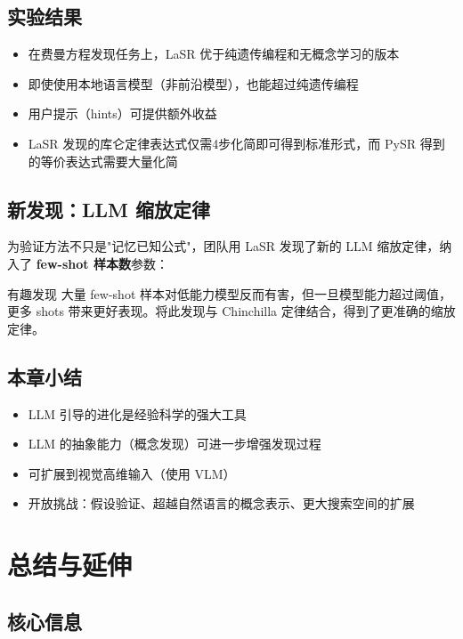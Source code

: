 \documentclass[a4paper]{article}
\begin{document}
\subsection{实验结果}

\begin{itemize}
    \item 在费曼方程发现任务上，LaSR 优于纯遗传编程和无概念学习的版本
    \item 即使使用本地语言模型（非前沿模型），也能超过纯遗传编程
    \item 用户提示（hints）可提供额外收益
    \item LaSR 发现的库仑定律表达式仅需4步化简即可得到标准形式，而 PySR 得到的等价表达式需要大量化简
\end{itemize}

\subsection{新发现：LLM 缩放定律}

为验证方法不只是"记忆已知公式"，团队用 LaSR 发现了新的 LLM 缩放定律，纳入了 \textbf{few-shot 样本数}参数：

\begin{warningbox}{有趣发现}
大量 few-shot 样本对低能力模型反而有害，但一旦模型能力超过阈值，更多 shots 带来更好表现。将此发现与 Chinchilla 定律结合，得到了更准确的缩放定律。
\end{warningbox}

\subsection{本章小结}

\begin{itemize}
    \item LLM 引导的进化是经验科学的强大工具
    \item LLM 的抽象能力（概念发现）可进一步增强发现过程
    \item 可扩展到视觉高维输入（使用 VLM）
    \item 开放挑战：假设验证、超越自然语言的概念表示、更大搜索空间的扩展
\end{itemize}

\section{总结与延伸}

\subsection{核心信息}
\end{document}
